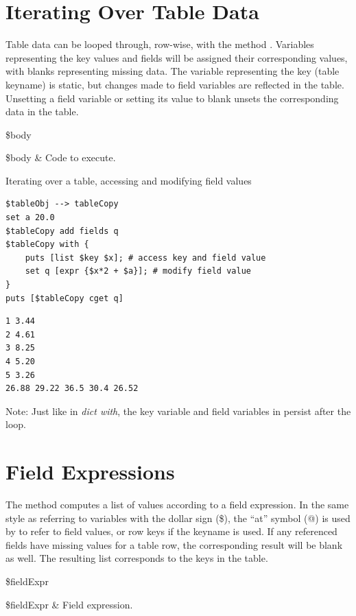 \section{Iterating Over Table Data}
Table data can be looped through, row-wise, with the method . 
Variables representing the key values and fields will be assigned their corresponding values, with blanks representing missing data. 
The variable representing the key (table keyname) is static, but changes made to field variables are reflected in the table. 
Unsetting a field variable or setting its value to blank unsets the corresponding data in the table. 
\begin{syntax}
 \$body
\end{syntax}
\begin{args}
\$body & Code to execute.
\end{args}
\begin{example}{Iterating over a table, accessing and modifying field values}
\begin{lstlisting}
$tableObj --> tableCopy
set a 20.0
$tableCopy add fields q
$tableCopy with {
    puts [list $key $x]; # access key and field value
    set q [expr {$x*2 + $a}]; # modify field value
}
puts [$tableCopy cget q]
\end{lstlisting}
\tcblower
\begin{lstlisting}
1 3.44
2 4.61
3 8.25
4 5.20
5 3.26
26.88 29.22 36.5 30.4 26.52
\end{lstlisting}
\end{example}
Note: Just like in \textit{dict with}, the key variable and field variables in  persist after the loop.
\clearpage
\section{Field Expressions}
The method  computes a list of values according to a field expression. 
In the same style as referring to variables with the dollar sign (\$), the ``at'' symbol (@) is used by  to refer to field values, or row keys if the keyname is used. 
If any referenced fields have missing values for a table row, the corresponding result will be blank as well. 
The resulting list corresponds to the keys in the table.
\begin{syntax}
 \$fieldExpr
\end{syntax}
\begin{args}
\$fieldExpr & Field expression.
\end{args}
